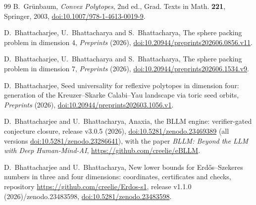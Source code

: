 \documentclass[aps,prd,twocolumn,superscriptaddress,nofootinbib,longbibliography,floatfix,showkeys,amsmath,amssymb,10pt]{revtex4-2}
\theoremstyle{plain}
\theoremstyle{definition}
\theoremstyle{plain}
\def\zenodoID{10.5281/zenodo.23483598}%
\newcommand{\zenodoDOI}{\ifx\zenodoID\empty\else, \href{https://doi.org/\zenodoID}{doi:\zenodoID}\fi}
\begin{document}
\begin{thebibliography}{99}
 B.~Gr\"unbaum, \emph{Convex Polytopes}, 2nd ed., Grad. Texts in Math. \textbf{221}, Springer, 2003, \href{https://doi.org/10.1007/978-1-4613-0019-9}{doi:10.1007/978-1-4613-0019-9}.

 D.~Bhattacharjee, U.~Bhattacharya and S.~Bhattacharya, The sphere packing problem in dimension 4, \emph{Preprints} (2026), \href{https://doi.org/10.20944/preprints202606.0856.v11}{doi:10.20944/preprints202606.0856.v11}.

 D.~Bhattacharjee, U.~Bhattacharya and S.~Bhattacharya, The sphere packing problem in dimension 7, \emph{Preprints} (2026), \href{https://doi.org/10.20944/preprints202606.1534.v9}{doi:10.20944/preprints202606.1534.v9}.

 D.~Bhattacharjee, Seed universality for reflexive polytopes in dimension four: generation of the Kreuzer--Skarke Calabi--Yau landscape via toric seed orbits, \emph{Preprints} (2026), \href{https://doi.org/10.20944/preprints202603.1056.v1}{doi:10.20944/preprints202603.1056.v1}.

 D.~Bhattacharjee and U.~Bhattacharya, Anaxia, the BLLM engine: verifier-gated conjecture closure, release v3.0.5 (2026), \href{https://doi.org/10.5281/zenodo.23469389}{doi:10.5281/zenodo.23469389} (all versions \href{https://doi.org/10.5281/zenodo.23286641}{doi:10.5281/zenodo.23286641}), with the paper \emph{BLLM: Beyond the LLM with Deep Human-Mind-AI}, \url{https://github.com/creelie/eBLLM}.

 D.~Bhattacharjee and U.~Bhattacharya, New lower bounds for Erd\H{o}s--Szekeres numbers in three and four dimensions: coordinates, certificates and checks, repository \url{https://github.com/creelie/Erdos-s1}, release v1.1.0 (2026)\zenodoDOI.

\end{thebibliography}

\clearpage




\end{document}
